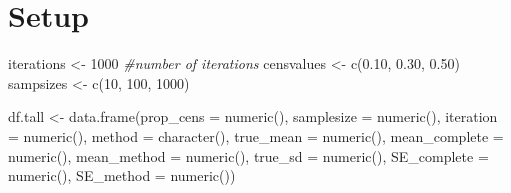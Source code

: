 \documentclass[12pt, twoside]{amherstthesis}
\newenvironment{Shaded}{\begin{snugshade}}{\end{snugshade}}
\newcommand{\AttributeTok}[1]{\textcolor[rgb]{0.77,0.63,0.00}{#1}}
\newcommand{\CommentTok}[1]{\textcolor[rgb]{0.56,0.35,0.01}{\textit{#1}}}
\newcommand{\ConstantTok}[1]{\textcolor[rgb]{0.00,0.00,0.00}{#1}}
\newcommand{\DecValTok}[1]{\textcolor[rgb]{0.00,0.00,0.81}{#1}}
\newcommand{\FloatTok}[1]{\textcolor[rgb]{0.00,0.00,0.81}{#1}}
\newcommand{\FunctionTok}[1]{\textcolor[rgb]{0.00,0.00,0.00}{#1}}
\newcommand{\NormalTok}[1]{#1}
\newcommand{\OtherTok}[1]{\textcolor[rgb]{0.56,0.35,0.01}{#1}}
\newcommand{\SpecialCharTok}[1]{\textcolor[rgb]{0.00,0.00,0.00}{#1}}
\newcommand{\StringTok}[1]{\textcolor[rgb]{0.31,0.60,0.02}{#1}}
\begin{document}
\begin{Shaded}
\end{Shaded}
\hypertarget{setup}{%
\section{Setup}\label{setup}}
\begin{Shaded}
\begin{Highlighting}[]
\NormalTok{iterations }\OtherTok{\textless{}{-}} \DecValTok{1000} \CommentTok{\#number of iterations}
\NormalTok{censvalues }\OtherTok{\textless{}{-}} \FunctionTok{c}\NormalTok{(}\FloatTok{0.10}\NormalTok{, }\FloatTok{0.30}\NormalTok{, }\FloatTok{0.50}\NormalTok{)}
\NormalTok{sampsizes }\OtherTok{\textless{}{-}} \FunctionTok{c}\NormalTok{(}\DecValTok{10}\NormalTok{, }\DecValTok{100}\NormalTok{, }\DecValTok{1000}\NormalTok{)}

\NormalTok{df.tall }\OtherTok{\textless{}{-}} \FunctionTok{data.frame}\NormalTok{(}\AttributeTok{prop\_cens =} \FunctionTok{numeric}\NormalTok{(),}
                      \AttributeTok{samplesize =} \FunctionTok{numeric}\NormalTok{(),}
                      \AttributeTok{iteration =} \FunctionTok{numeric}\NormalTok{(),}
                      \AttributeTok{method =} \FunctionTok{character}\NormalTok{(),}
                      \AttributeTok{true\_mean =} \FunctionTok{numeric}\NormalTok{(),}
                      \AttributeTok{mean\_complete =} \FunctionTok{numeric}\NormalTok{(),}
                      \AttributeTok{mean\_method =} \FunctionTok{numeric}\NormalTok{(),}
                      \AttributeTok{true\_sd =} \FunctionTok{numeric}\NormalTok{(),}
                      \AttributeTok{SE\_complete =} \FunctionTok{numeric}\NormalTok{(),}
                      \AttributeTok{SE\_method =} \FunctionTok{numeric}\NormalTok{())}
\end{Highlighting}
\end{Shaded}
\end{document}
